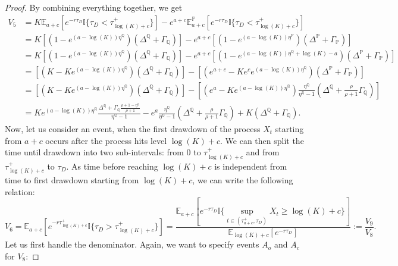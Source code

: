 \documentclass[10pt,a4paper]{amsart}
\def\E{{\mathbb{E}}}
\def\P{{\mathbb{P}}}
\def\Q{{\mathbb{Q}}}
\def \R{{{\rm I{\!}\rm R}}}
\def \I{{\mathbb{I}}}
\def\P{{\mathbb P}} \def\le{\left} \def\ri{\right} \def\i{\infty}
\def\E{{\mathbb E}} \def\PP{\mc P} \def\Z{{\mathbb Z}} \def\R{{\mathbb R}}
\begin{document}
\begin{proof}
			
			By combining everything together, we get
			\begin{align}
				\nonumber V_5 &= K\E_{a+c} \left[ e^{-r\tau_D} \I \{ \tau_D < \tau_{\log(K)+c}^+ \} \right] - e^{a+c}\E^\P_{a+c} \left[ e^{-r\tau_D} \I \{ \tau_D < \tau_{\log(K)+c}^+ \} \right] \\
				\nonumber & = K\left[ \left(1 - e^{(a-\log(K))\eta^\Q}\right)\left( \Delta^\Q + \Gamma_\Q \right)  \right] - e^{a+c}\left[ \left(1 - e^{(a-\log(K))\eta^\P}\right)\left( \Delta^\P + \Gamma_\P \right)  \right] \\
				\nonumber & = K\left[ \left(1 - e^{(a-\log(K))\eta^\Q}\right)\left( \Delta^\Q + \Gamma_\Q \right)  \right] - e^{a+c}\left[ \left(1 - e^{(a-\log(K))\eta^\Q + \log(K)-a}\right)\left( \Delta^\P + \Gamma_\P \right)  \right] \\
				\nonumber & = \left[ \left(K - Ke^{(a-\log(K))\eta^\Q}\right)\left( \Delta^\Q + \Gamma_\Q \right)  \right] - \left[ \left(e^{a+c} - Ke^ce^{(a-\log(K))\eta^\Q}\right)\left( \Delta^\P + \Gamma_\P \right)  \right] \\
				\nonumber & = \left[ \left(K - Ke^{(a-\log(K))\eta^\Q}\right)\left( \Delta^\Q + \Gamma_\Q \right)  \right] - \left[ \left(e^{a} - Ke^{(a-\log(K))\eta^\Q}\right)\frac{\eta^\Q}{\eta^\Q-1}\left( \Delta^\Q + \frac{\rho}{\rho+1}\Gamma_\Q \right)  \right] \\
				& = Ke^{(a-\log(K))\eta^\Q}\frac{\Delta^\Q + \Gamma_\Q \frac{\rho+1-\eta^\Q}{\rho+1}}{\eta^\Q-1} - e^a \frac{\eta^\Q}{\eta^\Q-1}\left( \Delta^\Q + \frac{\rho}{\rho+1}\Gamma_\Q \right) + K\left( \Delta^\Q + \Gamma_\Q \right). \label{V5}
			\end{align}		
			Now, let us consider an event, when the first drawdown of the process $X_t$ starting from $a+c$ occurs after the process hits level $\log(K) + c$. We can then split the time until drawdown into two sub-intervals: from 0 to $\tau_{\log(K)+c}^+$ and from $\tau_{\log(K)+c}^+$ to $\tau_D$. As time before reaching $\log(K)+c$ is independent from time to first drawdown starting from $\log(K)+c$, we can write the following relation:
			\begin{equation}\label{V6_1st}
				V_6 = \E_{a+c}\left[ e^{-r\tau_{\log(K)+c}^+}  \I
				\{ \tau_D > \tau_{\log(K)+c}^+ \} \right] = \frac{\E_{a+c}\left[ e^{-r\tau_D}  \I
					\{ \sup_{t \in (\tau^+_{a+c},\tau_D)} X_t \geq \log(K)+c \} \right]}{\E_{\log(K)+c}\left[ e^{-r\tau_D}\right]} := \frac{V_9}{V_8}.
			\end{equation}	
			Let us first handle the denominator. Again, we want to specify events $A_o$ and $A_c$ for $V_8$:		

\end{proof}
\end{document}
